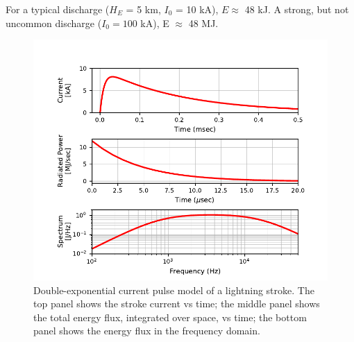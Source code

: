 For a typical discharge ($H_E$ = 5 km, $I_0$ = 10 kA), $E \approx$ 48 kJ. A strong, but not uncommon discharge ($I_0 = 100$ kA), E $\approx$ 48 MJ.
\begin{figure}[t]
\begin{center}
\includegraphics{figures/Lightning_spectra_v2.pdf}

\caption[Time and frequency profiles of the lightning illumination model]{Double-exponential current pulse model of a lightning stroke. The top panel shows the stroke current vs time; the middle panel shows the total energy flux, integrated over space, vs time; the bottom panel shows the energy flux in the frequency domain.}
\label{fig:lightning_spectrum}
\end{center}
\end{figure}
